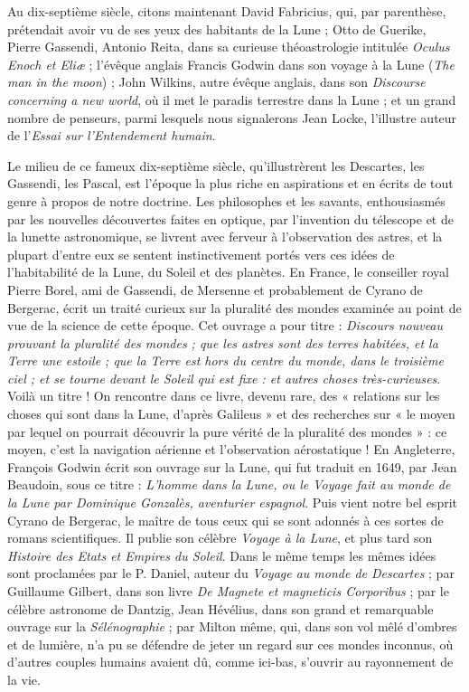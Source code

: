 \documentclass[a4paper, 11pt, oneside]{article}
\begin{document}
Au dix-septième siècle, citons maintenant David Fabricius, qui, par parenthèse, prétendait avoir vu de ses yeux des habitants de la Lune ; Otto de Guerike, Pierre Gassendi, Antonio Reita, dans sa curieuse théoastrologie intitulée \emph{Oculus Enoch et Eliæ} ; l'évêque anglais Francis Godwin dans son voyage à la Lune (\emph{The man in the moon}) ; John Wilkins, autre évêque anglais, dans son \emph{Discourse concerning a new world}, où il met le paradis terrestre dans la Lune ; et un grand nombre de penseurs, parmi lesquels nous signalerons Jean Locke, l'illustre auteur de l'\emph{Essai sur l'Entendement humain}.

Le milieu de ce fameux dix-septième siècle, qu'illustrèrent les Descartes, les Gassendi, les Pascal, est l'époque la plus riche en aspirations et en écrits de tout genre à propos de notre doctrine. Les philosophes et les savants, enthousiasmés par les nouvelles découvertes faites en optique, par l'invention du télescope et de la lunette astronomique, se livrent avec ferveur à l'observation des astres, et la plupart d'entre eux se sentent instinctivement portés vers ces idées de l'habitabilité de la Lune, du Soleil et des planètes. En France, le conseiller royal Pierre Borel, ami de Gassendi, de Mersenne et probablement de Cyrano de Bergerac, écrit un traité curieux sur la pluralité des mondes examinée au point de vue de la science de cette époque. Cet ouvrage a pour titre : \emph{Discours nouveau prouvant la pluralité des mondes ; que les astres sont des terres habitées, et la Terre une estoile ; que la Terre est hors du centre du monde, dans le troisième ciel ; et se tourne devant le Soleil qui est fixe : et autres choses très-curieuses}. Voilà un titre ! On rencontre dans ce livre, devenu rare, des « relations sur les choses qui sont dans la Lune, d'après Galileus » et des recherches sur « le moyen par lequel on pourrait découvrir la pure vérité de la pluralité des mondes » : ce moyen, c'est la navigation aérienne et l'observation aérostatique ! En Angleterre, François Godwin écrit son ouvrage sur la Lune, qui fut traduit en 1649, par Jean Beaudoin, sous ce titre : \emph{L'homme dans la Lune, ou le Voyage fait au monde de la Lune par Dominique Gonzalès, aventurier espagnol}. Puis vient notre bel esprit Cyrano de Bergerac, le maître de tous ceux qui se sont adonnés à ces sortes de romans scientifiques. Il publie son célèbre \emph{Voyage à la Lune}, et plus tard son \emph{Histoire des Etats et Empires du Soleil}. Dans le même temps les mêmes idées sont proclamées par le P. Daniel, auteur du \emph{Voyage au monde de Descartes} ; par Guillaume Gilbert, dans son livre \emph{De Magnete et magneticis Corporibus} ; par le célèbre astronome de Dantzig, Jean Hévélius, dans son grand et remarquable ouvrage sur la \emph{Sélénographie} ; par Milton même, qui, dans son vol mêlé d'ombres et de lumière, n'a pu se défendre de jeter un regard sur ces mondes inconnus, où d'autres couples humains avaient dû, comme ici-bas, s'ouvrir au rayonnement de la vie.
\end{document}
